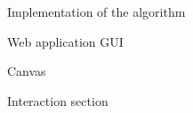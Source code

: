 \documentclass[9pt]{extarticle}
\begin{document}
\begin{section}{Implementation of the algorithm}
\begin{subsection}{Web application GUI}
            \begin{subsubsection}{Canvas}
            \end{subsubsection}
            

            \begin{subsubsection}{Interaction section}
                \label{subsec:interaction}


\end{subsubsection}
\end{subsection}
\end{section}
\end{document}
